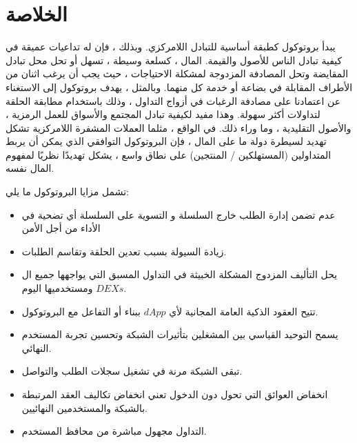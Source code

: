 \documentclass[12pt, a4paper, leqno]{report}
\theoremstyle{plain}
\theoremstyle{definition}
\begin{document}
\chapter{الخلاصة}
\begin{multicols}{2}
\begin{otherlanguage}{arabic}
يبدأ بروتوكول    كطبقة أساسية للتبادل اللامركزي. وبذلك ، فإن له تداعيات عميقة في كيفية تبادل الناس للأصول والقيمة. المال ، كسلعة وسيطة ، تسهل أو تحل محل تبادل المقايضة وتحل المصادفة المزدوجة لمشكلة الاحتياجات  ، حيث يجب أن يرغب اثنان من الأطراف المقابلة في بضاعة أو خدمة كل منهما. وبالمثل ، يهدف بروتوكول  إلى الاستغناء عن اعتمادنا على مصادفة الرغبات في أزواج التداول ، وذلك باستخدام مطابقة الحلقة لتداولات أكثر سهولة. وهذا مفيد لكيفية تبادل المجتمع والأسواق للعمل الرمزية ، والأصول التقليدية ، وما وراء ذلك. في الواقع ، مثلما العملات المشفرة اللامركزية تشكل تهديد لسيطرة دولة ما على المال ، فإن البروتوكول التوافقي الذي يمكن أن يربط المتداولين (المستهلكين / المنتجين) على نطاق واسع ، يشكل تهديدًا نظريًا لمفهوم المال نفسه.

تشمل مزايا البروتوكول ما يلي:
\begin{itemize}

	\item عدم تضمن إدارة الطلب خارج السلسلة و التسوية على السلسلة أي تضحية في الأداء من أجل الأمن	
	\item زيادة السيولة بسبب تعدين الحلقة وتقاسم الطلبات.
	\item يحل التأليف المزدوج المشكلة الخبيثة في التداول المسبق التي يواجهها جميع ال $DEXs$  ومستخدميها اليوم.
	\item تتيح العقود الذكية العامة المجانية لأي $dApp$ ببناء أو التفاعل مع البروتوكول.
	\item يسمح التوحيد القياسي بين المشغلين بتأثيرات الشبكة وتحسين تجربة المستخدم النهائي.
	\item تبقى الشبكة مرنة في تشغيل سجلات الطلب والتواصل.
	\item انخفاض العوائق التي تحول دون الدخول تعني انخفاض تكاليف العقد المرتبطة بالشبكة والمستخدمين النهائيين.
	\item التداول مجهول مباشرة من محافظ المستخدم.
\end{itemize}
\end{otherlanguage}
\end{multicols}

\end{document}
